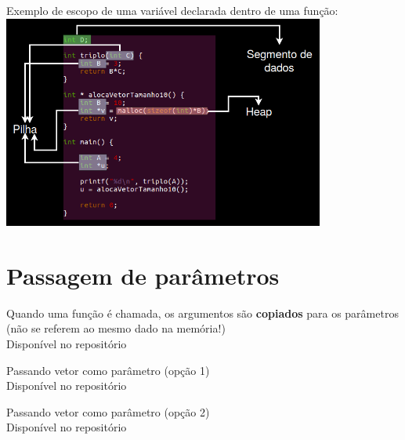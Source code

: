 \documentclass[portuguese,10pt,xcolor=table]{bredelebeamer}
\begin{document}
	\begin{frame}
		Exemplo de escopo de uma variável declarada dentro de uma função:\\
			\includegraphics[height=7.0cm]{setoresMemoria.png}\\

	\end{frame}


	\section{Passagem de parâmetros}
	\begin{frame}
		\begin{center}
		\end{center}
	\end{frame} 

	\begin{frame}
		Quando uma função é chamada, os argumentos são \textbf{copiados} para os parâmetros (não se referem ao mesmo dado na memória!)\\
				Disponível no repositório
	\end{frame}

	\begin{frame}
		Passando vetor como parâmetro (opção 1)\\
				Disponível no repositório
	\end{frame}

	\begin{frame}
		Passando vetor como parâmetro (opção 2)\\
				Disponível no repositório
	\end{frame}
\end{document}
